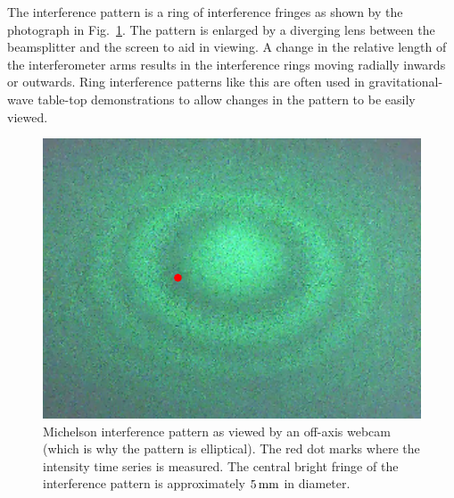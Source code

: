 \documentclass[paper-main.tex]{subfiles}
\begin{document}
The interference pattern is a ring of interference fringes as shown by the photograph in Fig.~\ref{fig:interference_pattern}. 
The pattern is enlarged by a diverging lens between the beamsplitter and the screen to aid in viewing. 
A change in the relative length of the interferometer arms results in the interference rings moving radially inwards or outwards. 
Ring interference patterns like this are often used in gravitational-wave table-top demonstrations to allow changes in the pattern to be easily viewed. 


\begin{figure}
 \begin{center}
  \includegraphics[width=.45\textwidth]{figures/webcam_still0_crop.pdf}
 \end{center}
 \caption{\label{fig:interference_pattern}
Michelson interference pattern as viewed by an off-axis webcam (which is why the pattern is elliptical). 
The red dot marks where the intensity time series is measured. 
The central bright fringe of the interference pattern is approximately $5\,{\rm mm}$ in diameter. 
}
\end{figure}
\end{document}

